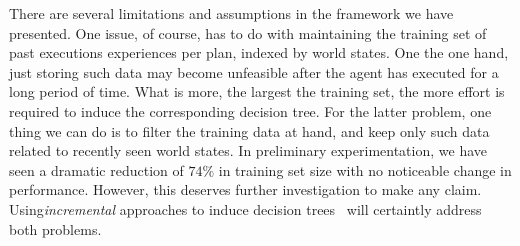 \bigskip
There are several limitations and assumptions in the framework we have presented.
One issue, of course, has to do with maintaining the training set of past executions experiences per plan, indexed by world states. One the one hand, just storing such data may become unfeasible after the agent has executed for a long period of time. What is more, the largest the training set, the more effort is required to induce the corresponding decision tree. For the latter problem, one thing we can do is to  filter the training data at hand, and keep only such data related to recently seen world states. In preliminary experimentation, we have seen a dramatic reduction of $74\%$ in training set size with no noticeable change in performance. However, this deserves further investigation to make any claim. Using\emph{incremental} approaches to induce decision trees~\cite{} will certaintly address both problems.




